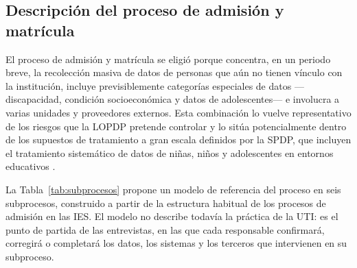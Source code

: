 \subsection{Descripción del proceso de admisión y matrícula}

El proceso de admisión y matrícula se eligió porque concentra, en un periodo breve, la recolección masiva de datos de personas que aún no tienen vínculo con la institución, incluye previsiblemente categorías especiales de datos ---discapacidad, condición socioeconómica y datos de adolescentes--- e involucra a varias unidades y proveedores externos. Esta combinación lo vuelve representativo de los riesgos que la LOPDP pretende controlar \cite[arts.~25 y 40]{lopdp2021} y lo sitúa potencialmente dentro de los supuestos de tratamiento a gran escala definidos por la SPDP, que incluyen el tratamiento sistemático de datos de niñas, niños y adolescentes en entornos educativos \cite{spdp2026granescala}.

La Tabla~\ref{tab:subprocesos} propone un modelo de referencia del proceso en seis subprocesos, construido a partir de la estructura habitual de los procesos de admisión en las IES. El modelo no describe todavía la práctica de la UTI: es el punto de partida de las entrevistas, en las que cada responsable confirmará, corregirá o completará los datos, los sistemas y los terceros que intervienen en su subproceso.

